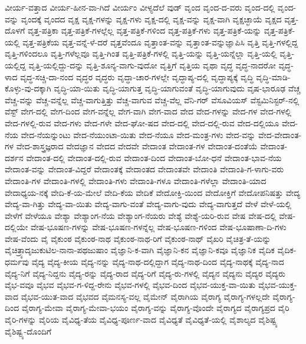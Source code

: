 {ವೀರ್ಯ-ವತ್ತಾದ
ವೀರ್ಯ-ಹೀನ-ವಾ-ಗಿದೆ
ವೀರ್ಯಂ
ವೀಳ್ಯದೆಲೆ
ವುಡ್
ವೃಂದ
ವೃಂದ-ದ-ವರು
ವೃಂದ-ದಲ್ಲಿ
ವೃಂದ-ವನ್ನು
ವೃಂದಕ್ಕೆ
ವೃಂದದ
ವೃಕ್ಷ
ವೃಕ್ಷ-ಗಳನ್ನು
ವೃಕ್ಷ-ಗಳು
ವೃಕ್ಷ-ದಲ್ಲಿ
ವೃಕ್ಷ-ವನ್ನು
ವೃಕ್ಷ-ವಾಗಿ
ವೃಕ್ಷಚ್ಛಾಯೆ
ವೃಕ್ಷದ
ವೃತ್ತ-ದೊಳಗೆ
ವೃತ್ತ-ಪತ್ರಿಕಾ
ವೃತ್ತ-ಪತ್ರಿಕೆ-ಗಳಲ್ಲೆಲ್ಲ
ವೃತ್ತ-ಪತ್ರಿಕೆ-ಗಳಿಂದ
ವೃತ್ತ-ಪತ್ರಿಕೆ-ಗಳು
ವೃತ್ತ-ಪತ್ರಿಕೆ-ಯನ್ನು
ವೃತ್ತ-ಪತ್ರಿಕೆ-ಯಲ್ಲಿ
ವೃತ್ತ-ಪತ್ರಿಕೆಯ
ವೃತ್ತ-ವನ್ನೆ-ಳೆ-ದರೆ
ವೃತ್ತವೆಂದೂ
ವೃತ್ತಾಂತ-ವನ್ನು
ವೃತ್ತಾಂತ-ವನ್ನುಜ್ಞಾಪಿಸಿ
ವೃತ್ತಿ
ವೃತ್ತಿ-ಗಳಲ್ಲಿದ್ದ
ವೃತ್ತಿ-ಗಳಿಂದಲೂ
ವೃತ್ತಿ-ಗಳೆಲ್ಲವೂ
ವೃತ್ತಿ-ಗಿಂತ
ವೃತ್ತಿ-ಪತ್ರಿಕೆ-ಗಳಲ್ಲಿ
ವೃತ್ತಿ-ಯನ್ನು
ವೃತ್ತಿ-ಯನ್ನೆಲ್ಲಾ
ವೃತ್ತಿ-ಯಲ್ಲಿ
ವೃತ್ತಿ-ಯಲ್ಲಿದ್ದ
ವೃತ್ತಿ-ಯಲ್ಲಿದ್ದು-ದನ್ನು
ವೃತ್ತಿ-ಶೂನ್ಯ-ವಾಗು-ವುದೋ
ವೃತ್ತಿಗೆ
ವೃತ್ತಿಯ
ವೃಥಾ
ವೃದ್ಧ
ವೃದ್ಧ-ನಾದರೋ
ವೃದ್ಧ-ಳಾದ
ವೃದ್ಧ-ಸಚ್ಚಿ-ದಾ-ನಂದ
ವೃದ್ಧರ
ವೃದ್ಧರು
ವೃದ್ಧಾ-ಚಾರ-ಗಳಲ್ಲೇ
ವೃದ್ಧಾಪ್ಯ-ದಲ್ಲಿ
ವೃದ್ಧಾಪ್ಯಕ್ಕೆ
ವೃದ್ಧಿ
ವೃದ್ಧಿ-ಮಾಡಿ-ಕೊಳ್ಳು-ವು-ದಕ್ಕಾಗಿ
ವೃದ್ಧಿ-ಯಾ-ಯಿತು
ವೃದ್ಧಿ-ಯಾಗುತ್ತ
ವೃದ್ಧಿ-ಯಾಗುವಂತೆ
ವೃದ್ಧಿ-ಯಾಗುವುದು
ವೃಷ-ಭಾರೂಢ
ವೆಚ್ಚ
ವೆಚ್ಚ-ವನ್ನು
ವೆಚ್ಚ-ವನ್ನೆಲ್ಲ
ವೆಚ್ಚ-ವಾಗುತ್ತಿತ್ತು
ವೆಚ್ಚ-ವಾಗುವ
ವೆಚ್ಚ-ವೆಲ್ಲ
ವೆನಿ-ಗರ್
ವೆಸೂವಿಯಸ್
ವೆಸ್ಟಮಿನಿಸ್ಟರ್-ನಲ್ಲಿ
ವೆಸ್ಟ್
ವೇಗ-ದಲ್ಲಿ
ವೇಗ-ದಿಂದ
ವೇಗ-ವನ್ನೆಲ್ಲ
ವೇಗ-ವಾಗಿ
ವೇಗ-ವಾದ
ವೇದ
ವೇದ-ಗಳನ್ನು
ವೇದ-ಗಳ
ವೇದ-ಗಳಲ್ಲಿ
ವೇದ-ಗಳಲ್ಲಿ-ರುವ
ವೇದ-ಗಳು
ವೇದ-ಗಳೇ
ವೇದ-ಘೋ-ಷದ
ವೇದ-ದಲ್ಲಿ
ವೇದ-ದಲ್ಲಿ-ರುವ
ವೇದ-ದಲ್ಲಿಯೂ
ವೇದ-ನೆಯ
ವೇದ-ನೆಯನ್ನುಂಟು
ವೇದ-ನೆಯುಂಟಾ-ಯಿತು
ವೇದ-ನೆಯೂ
ವೇದ-ಮಂತ್ರ-ಗಳು
ವೇದ-ವನ್ನು
ವೇದ-ವೇದಾಂತ-ಗಳ
ವೇದ-ಶಾಸ್ತ್ರಜ್ಞರಾದ
ವೇದಜ್ಞಾನ
ವೇದದ
ವೇದವೇ
ವೇದಾಂತ
ವೇದಾಂತ-ಗಳ
ವೇದಾಂತ-ದಂತೆಯೆ
ವೇದಾಂತ-ದರ್ಶನ
ವೇದಾಂತ-ದಲ್ಲಿ
ವೇದಾಂತ-ದಲ್ಲಿ-ರುವ
ವೇದಾಂತ-ದಿಂದ
ವೇದಾಂತ-ಬೋ-ಧನೆ
ವೇದಾಂತ-ಭಾವ-ನೆಯ
ವೇದಾಂತ-ವನ್ನು
ವೇದಾಂತ-ವಿದ್ದರೆ
ವೇದಾಂತಕ್ಕೆ
ವೇದಾಂತದ
ವೇದಾಂತವೇ
ವೇದಾಂತಿ
ವೇದಾಂತಿ-ಗ-ಳಾಗು-ವರು
ವೇದಾಂತಿ-ಗಳ
ವೇದಾಂತಿ-ಗಳಲ್ಲಿ
ವೇದಾಂತಿ-ಗಳು
ವೇದಾಂತಿ-ಗಳೂ
ವೇದಾಂತಿ-ಗಳೆಲ್ಲಾ
ವೇದಾಂತಿ-ಯಾದ
ವೇದಾಧ್ಯಯ-ನಕ್ಕೆ
ವೇದಿ-ಕೆ-ಯ-ಮೇಲೆ
ವೇದಿ-ಕೆಯ
ವೇದಿಕೆ
ವೇದೋಕ್ತಿ-ಯಿಂದ
ವೇದೋಕ್ತಿಗೆ
ವೇದೋಪನಿಷತ್ತು
ವೇದ್ಯ
ವೇದ್ಯ-ವಾ-ಗಿತ್ತು
ವೇದ್ಯ-ವಾ-ಯಿತು
ವೇದ್ಯ-ವಾಗು-ವಂತೆ
ವೇದ್ಯ-ವಾಗು-ವುದು
ವೇದ್ಯ-ವಾಗುತ್ತದೆ
ವೇಳೆ
ವೇಳೆ-ಯಲ್ಲಿ
ವೇಳೆಗೆ
ವೇಳೆಯೂ
ವೇಶ್ಯಾ
ವೇಶ್ಯಾಂಗ-ನೆಯ
ವೇಶ್ಯಾಂಗ-ನೆಯರು
ವೇಶ್ಯೆ
ವೇಶ್ಯೆ-ಯರಿ-ರುವ
ವೇಷ
ವೇಷ-ದಲ್ಲಿ
ವೇಷ-ದಲ್ಲಿಯೇ
ವೇಷ-ಭೂಷಣ-ಗಳನ್ನು
ವೇಷ-ಭೂಷಣ-ಗಳನ್ನೆಲ್ಲ
ವೇಷ-ಭೂಷಣ-ಗಳಿಂದ
ವೇಷ-ಭೂಷಾಣಾ-ದಿ-ಗಳು
ವೇಷ-ವೆಂದು
ವೈ
ವೈಕುಂಠ
ವೈಕುಂಠ-ನಾಥ
ವೈಕುಂಠ-ನಾಥ-ರಿಗೆ
ವೈಕುಂಠ-ನಾಥ್
ವೈಖರಿ
ವೈಚಿತ್ರ-ತೆ-ಯನ್ನು
ವೈಚಿತ್ರ್ಯಾದೃಜುಕುಟಿಲ-ನಾನಾ-ಪಥಜುಷಾಂ
ವೈಜ್ಞಾನಿ-ಕ-ವಾಗಿ
ವೈಜ್ಞಾನಿ-ಕನ
ವೈಜ್ಞಾನಿ-ಕವೂ
ವೈಜ್ಞಾನಿಕ
ವೈದಿಕ
ವೈದಿಕ-ಧರ್ಮವು
ವೈದ್ಯ
ವೈದ್ಯ-ಕೀಯ
ವೈದ್ಯ-ನನ್ನು
ವೈದ್ಯ-ನಾಥ-ದಲ್ಲಿದ್ದಾಗ
ವೈದ್ಯ-ನಾಥ-ದಿಂದ
ವೈದ್ಯ-ನಾಥಕ್ಕೆ
ವೈದ್ಯ-ನಾದ
ವೈದ್ಯ-ನಿಗೆ
ವೈದ್ಯ-ನಿದ್ದನು
ವೈದ್ಯ-ರನ್ನು
ವೈದ್ಯ-ರಾದ
ವೈದ್ಯ-ರಿಗೆ
ವೈದ್ಯ-ರು-ಗಳಲ್ಲಿ
ವೈದ್ಯನ
ವೈದ್ಯನು
ವೈದ್ಯರ
ವೈದ್ಯರು
ವೈಭ-ವವೂ
ವೈಭವ
ವೈಭವ-ಗ-ಳಿದ್ದ-ರೇನು
ವೈಭವ-ಗಳಲ್ಲಿ
ವೈಭವ-ದಿಂದ
ವೈಭವ-ಯುಕ್ತ-ವಾ-ಯಿತು
ವೈಭವ-ಯುಕ್ತ-ವಾದ
ವೈಭವ-ಯುತ-ವಾದ
ವೈಭವದ
ವೈಮನಸ್ಯ-ವಲ್ಲ
ವೈಮೇನ್
ವೈರಾಗಿಯ
ವೈರಾಗ್ಯ
ವೈರಾಗ್ಯ-ಗಳಲ್ಲದೇ
ವೈರಾಗ್ಯ-ದಿಂದ
ವೈರಾಗ್ಯ-ಮೇವಾ
ವೈರಾಗ್ಯ-ಮೇವಾ-ಭಯಂ
ವೈರಾಗ್ಯ-ವನ್ನು
ವೈರಾಗ್ಯ-ವೊಂದೇ
ವೈರಾಗ್ಯದ
ವೈರಾಗ್ಯಪ್ರದ
ವೈರಿ
ವೈರಿ-ಗಳನ್ನು
ವೈರಿಯ
ವೈವಿಧ್ಯ-ತೆಯ
ವೈವಿಧ್ಯ-ಪೂರ್ಣ-ವಾದ
ವೈವಿಧ್ಯತೆ
ವೈವಿಧ್ಯತೆ-ಯಲ್ಲಿ
ವೈಶಾಲ್ಯದ
ವೈಶಿಷ್ಟ್ಯ
ವೈಶಿಷ್ಟ್ಯ-ದೊಂದಿಗೆ
}
